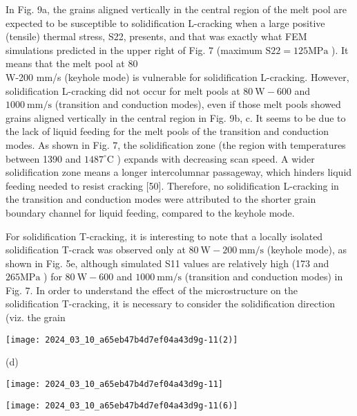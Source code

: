 \documentclass[10pt]{article}
\begin{document}
In Fig. 9a, the grains aligned vertically in the central region of the melt pool are expected to be susceptible to solidification L-cracking when a large positive (tensile) thermal stress, S22, presents, and that was exactly what FEM simulations predicted in the upper right of Fig. 7 (maximum $\mathrm{S} 22=125 \mathrm{MPa}$ ). It means that the melt pool at 80\\
W-200 mm/s (keyhole mode) is vulnerable for solidification L-cracking. However, solidification L-cracking did not occur for melt pools at $80 \mathrm{~W}-600$ and $1000 \mathrm{~mm} / \mathrm{s}$ (transition and conduction modes), even if those melt pools showed grains aligned vertically in the central region in Fig. 9b, c. It seems to be due to the lack of liquid feeding for the melt pools of the transition and conduction modes. As shown in Fig. 7, the solidification zone (the region with temperatures between 1390 and $1487^{\circ} \mathrm{C}$ ) expands with decreasing scan speed. A wider solidification zone means a longer intercolumnar passageway, which hinders liquid feeding needed to resist cracking [50]. Therefore, no solidification L-cracking in the transition and conduction modes were attributed to the shorter grain boundary channel for liquid feeding, compared to the keyhole mode.

For solidification T-cracking, it is interesting to note that a locally isolated solidification T-crack was observed only at $80 \mathrm{~W}-200 \mathrm{~mm} / \mathrm{s}$ (keyhole mode), as shown in Fig. 5e, although simulated S11 values are relatively high (173 and $265 \mathrm{MPa}$ ) for $80 \mathrm{~W}-600$ and $1000 \mathrm{~mm} / \mathrm{s}$ (transition and conduction modes) in Fig. 7. In order to understand the effect of the microstructure on the solidification T-cracking, it is necessary to consider the solidification direction (viz. the grain

\begin{center}
\texttt{[image: 2024\_03\_10\_a65eb47b4d7ef04a43d9g-11(2)]}
\end{center}

(d)

\begin{center}
\texttt{[image: 2024\_03\_10\_a65eb47b4d7ef04a43d9g-11]}
\end{center}

\begin{center}
\texttt{[image: 2024\_03\_10\_a65eb47b4d7ef04a43d9g-11(6)]}
\end{center}
\end{document}

